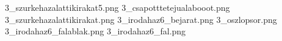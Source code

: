 3_szurkehazalattikirakat5.png
3_csapotttetejualabooot.png
3_szurkehazalattikirakat.png
3_irodahaz6_bejarat.png
3_oszlopsor.png
3_irodahaz6_falablak.png
3_irodahaz6_fal.png
